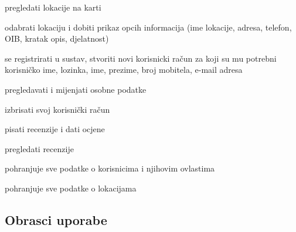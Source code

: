 			
			\begin{packed_enum}
				\item  {}
				
				\begin{packed_enum}
					
					\item pregledati lokacije na karti
					\item odabrati lokaciju i dobiti prikaz opcih informacija (ime lokacije, adresa, telefon, OIB, kratak opis, djelatnost)
					\item se registrirati u sustav, stvoriti novi korisnicki račun za koji su mu potrebni korisničko ime, lozinka, ime, prezime, broj mobitela, e-mail adresa
					
					
				\end{packed_enum}
			
				\item  {}
				
				\begin{packed_enum}
					
					\item pregledavati i mijenjati osobne podatke
					\item izbrisati svoj korisnički račun
					\item pisati recenzije i dati ocjene
					\item pregledati recenzije
					
				\end{packed_enum}
				
			
				\item  {}
				
				\begin{packed_enum}
					
					\item pohranjuje sve podatke o korisnicima i njihovim ovlastima
					\item pohranjuje sve podatke o lokacijama

					
				\end{packed_enum}
				
			\end{packed_enum}
			
			\eject 
			
			
				
			\subsection{Obrasci uporabe}
				
